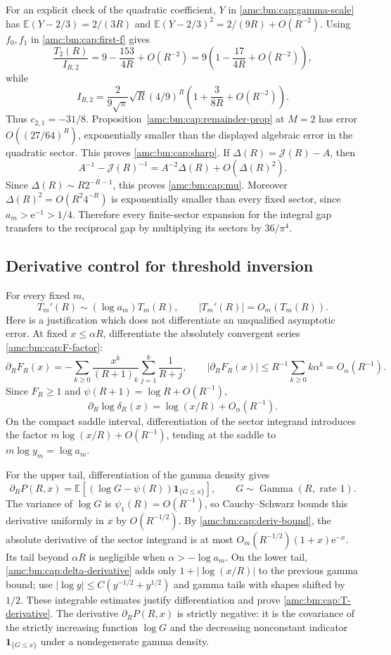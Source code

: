 \documentclass[11pt,letterpaper]{article}
\theoremstyle{remark}\newtheorem{remark}[theorem]{Remark}
\newcommand{\ee}{\mathrm e}
\newcommand{\ind}[1]{\mathbf1_{\{#1\}}}
\DeclareMathOperator{\GammaDist}{Gamma}
\begin{document}
For an explicit check of the quadratic coefficient, $Y$ in \eqref{amc:bm:cap:gamma-scale} has
$\mathbb E(Y-2/3)=2/(3R)$ and
$\mathbb E(Y-2/3)^2=2/(9R)+O(R^{-2})$.
Using $f_0,f_1$ in \eqref{amc:bm:cap:first-f} gives
\[
 \frac{T_2(R)}{I_{R,2}}=9-\frac{153}{4R}+O(R^{-2})
 =9\left(1-\frac{17}{4R}+O(R^{-2})\right),
\]
while
\[
 I_{R,2}=\frac2{9\sqrt\pi}\sqrt R(4/9)^R
 \left(1+\frac3{8R}+O(R^{-2})\right).
\]
Thus $c_{2,1}=-31/8$. Proposition~\ref{amc:bm:cap:remainder-prop} at $M=2$ has error $O((27/64)^R)$, exponentially smaller than the displayed algebraic error in the quadratic sector. This proves \eqref{amc:bm:cap:sharp}.
If $\Delta(R)=\mathcal J(R)-A$, then
\[
 A^{-1}-\mathcal J(R)^{-1}
 =A^{-2}\Delta(R)+O(\Delta(R)^2).
\]
Since $\Delta(R)\sim R2^{-R-1}$, this proves \eqref{amc:bm:cap:mu}. Moreover $\Delta(R)^2=O(R^2 4^{-R})$ is exponentially smaller than every fixed sector, since $a_m>\ee^{-1}>1/4$. Therefore every finite-sector expansion for the integral gap transfers to the reciprocal gap by multiplying its sectors by $36/\pi^4$.

\subsection{Derivative control for threshold inversion}
For every fixed $m$,
\begin{equation}\label{amc:bm:cap:T-derivative}
 T_m'(R)\sim(\log a_m)T_m(R),\qquad |T_m'(R)|=O_m(T_m(R)).
\end{equation}
Here is a justification which does not differentiate an unqualified asymptotic error. At fixed $x\le\alpha R$, differentiate the absolutely convergent series \eqref{amc:bm:cap:F-factor}:
\[
 \partial_RF_R(x)=-\sum_{k\ge0}\frac{x^k}{(R+1)_k}
      \sum_{j=1}^k\frac1{R+j},\qquad
 |\partial_RF_R(x)|\le R^{-1}\sum_{k\ge0}k\alpha^k=O_\alpha(R^{-1}).
\]
Since $F_R\ge1$ and $\psi(R+1)=\log R+O(R^{-1})$,
\begin{equation}\label{amc:bm:cap:delta-derivative}
 \partial_R\log\delta_R(x)=\log(x/R)+O_\alpha(R^{-1}).
\end{equation}
On the compact saddle interval, differentiation of the sector integrand introduces the factor $m\log(x/R)+O(R^{-1})$, tending at the saddle to $m\log y_m=\log a_m$.

For the upper tail, differentiation of the gamma density gives
\[
 \partial_RP(R,x)=\mathbb E[(\log G-\psi(R))\ind{G\le x}],
 \qquad G\sim\GammaDist(R,\text{ rate }1).
\]
The variance of $\log G$ is $\psi_1(R)=O(R^{-1})$, so Cauchy--Schwarz bounds this derivative uniformly in $x$ by $O(R^{-1/2})$. By \eqref{amc:bm:cap:deriv-bound}, the absolute derivative of the sector integrand is at most
$O_m(R^{-1/2})(1+x)\ee^{-x}$. Its tail beyond $\alpha R$ is negligible when $\alpha>-\log a_m$. On the lower tail, \eqref{amc:bm:cap:delta-derivative} adds only $1+|\log(x/R)|$ to the previous gamma bound; use $|\log y|\le C(y^{-1/2}+y^{1/2})$ and gamma tails with shapes shifted by $1/2$. These integrable estimates justify differentiation and prove \eqref{amc:bm:cap:T-derivative}.
The derivative $\partial_RP(R,x)$ is strictly negative: it is the covariance of the strictly increasing function $\log G$ and the decreasing nonconstant indicator $\ind{G\le x}$ under a nondegenerate gamma density.
\end{document}

